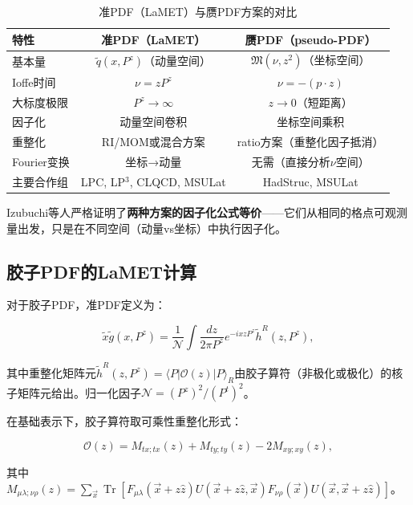\documentclass[12pt,a4paper]{ctexart}
\theoremstyle{definition}
\begin{document}
\begin{table}[H]
\centering
\caption{准PDF（LaMET）与赝PDF方案的对比}
\label{tab:quasi_vs_pseudo}
\begin{tabular}{lcc}
\toprule
特性 & 准PDF（LaMET）& 赝PDF（pseudo-PDF）\\
\midrule
基本量 & $\tilde{q}(x, P^z)$（动量空间）& $\mathfrak{M}(\nu, z^2)$（坐标空间）\\
Ioffe时间 & $\nu = zP^z$ & $\nu = -(p \cdot z)$\\
大标度极限 & $P^z \to \infty$ & $z \to 0$（短距离）\\
因子化 & 动量空间卷积 & 坐标空间乘积\\
重整化 & RI/MOM或混合方案 & ratio方案（重整化因子抵消）\\
Fourier变换 & 坐标→动量 & 无需（直接分析$\nu$空间）\\
主要合作组 & LPC, LP$^3$, CLQCD, MSULat & HadStruc, MSULat\\
\bottomrule
\end{tabular}
\end{table}

Izubuchi等人\cite{Izubuchi2018}严格证明了\textbf{两种方案的因子化公式等价}——它们从相同的格点可观测量出发，只是在不同空间（动量vs坐标）中执行因子化。

\subsection{胶子PDF的LaMET计算}

对于胶子PDF，准PDF定义为\cite{Chen2025gluon,Fan2018gluon,Zhang2019}：

\begin{equation}
\tilde{x}\tilde{g}(x, P^z) = \frac{1}{\mathcal{N}} \int \frac{dz}{2\pi P^z} e^{-ixzP^z} \tilde{h}^R(z, P^z),
\label{eq:gluon_quasi_pdf}
\end{equation}

其中重整化矩阵元$\tilde{h}^R(z, P^z) = \langle P|\mathcal{O}(z)|P\rangle_R$由胶子算符（非极化或极化）的核子矩阵元给出。归一化因子$\mathcal{N} = (P^z)^2/(P^t)^2$。

在基础表示下，胶子算符取可乘性重整化形式\cite{Chen2025gluon,Zhang2019}：

\begin{equation}
\mathcal{O}(z) = M_{tx;tx}(z) + M_{ty;ty}(z) - 2M_{xy;xy}(z),
\label{eq:gluon_operator}
\end{equation}

其中$M_{\mu\lambda;\nu\rho}(z) = \sum_{\vec{x}} \operatorname{Tr}[F_{\mu\lambda}(\vec{x}+z\hat{z})U(\vec{x}+z\hat{z},\vec{x})F_{\nu\rho}(\vec{x})U(\vec{x},\vec{x}+z\hat{z})]$。
\end{document}

